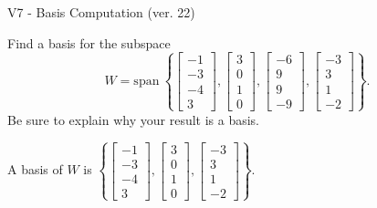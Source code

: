 \begin{exercise}
  \begin{exerciseTitle}V7 - Basis Computation (ver. 22)\end{exerciseTitle}
  \begin{exerciseStatement}
    Find a basis for the subspace 
\[W=\mathrm{span}\ \left\{\left[\begin{array}{r}
-1 \\
-3 \\
-4 \\
3
\end{array}\right] , \left[\begin{array}{r}
3 \\
0 \\
1 \\
0
\end{array}\right] , \left[\begin{array}{r}
-6 \\
9 \\
9 \\
-9
\end{array}\right] , \left[\begin{array}{r}
-3 \\
3 \\
1 \\
-2
\end{array}\right]\right\}.\]
 Be sure to explain why your result is a basis.


  \end{exerciseStatement}
  \begin{exerciseAnswer}
   A basis of \(W\) is  \(\left\{\left[\begin{array}{r}
-1 \\
-3 \\
-4 \\
3
\end{array}\right] , \left[\begin{array}{r}
3 \\
0 \\
1 \\
0
\end{array}\right] , \left[\begin{array}{r}
-3 \\
3 \\
1 \\
-2
\end{array}\right]\right\}\).
  


  \end{exerciseAnswer}
\end{exercise}